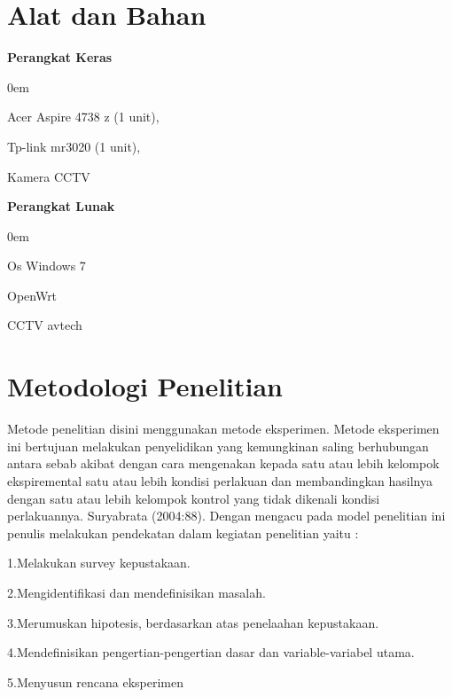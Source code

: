 \documentclass{jtetiproposalskripsi}
\begin{document}
\section{Alat dan Bahan}
\textbf{Perangkat Keras}
\vspace{-0.5cm}
\begin{enumerate}[a.]
\begin{singlespace}
\itemsep0em
\item Acer Aspire 4738 z (1 unit),
\item Tp-link mr3020 (1 unit),
\item Kamera CCTV 
\end{singlespace}
\end{enumerate}

\textbf{Perangkat Lunak}
\vspace{-0.5cm}
\begin{enumerate}[a.]
\begin{singlespace}
\itemsep0em
\item Os Windows 7
\item OpenWrt
\item CCTV avtech
\end{singlespace}
\end{enumerate}


\section{Metodologi Penelitian}
Metode penelitian disini menggunakan metode eksperimen. Metode eksperimen ini bertujuan melakukan penyelidikan yang kemungkinan saling berhubungan antara sebab akibat dengan cara mengenakan kepada satu atau lebih kelompok ekspiremental satu atau lebih kondisi perlakuan dan membandingkan hasilnya dengan satu atau lebih kelompok kontrol yang tidak dikenali kondisi perlakuannya. Suryabrata (2004:88). Dengan mengacu pada model penelitian ini penulis melakukan pendekatan dalam kegiatan penelitian yaitu :

1.Melakukan survey kepustakaan.

2.Mengidentifikasi dan mendefinisikan masalah.

3.Merumuskan hipotesis, berdasarkan atas penelaahan kepustakaan.

4.Mendefinisikan pengertian-pengertian dasar dan variable-variabel utama.

5.Menyusun rencana eksperimen

\end{document}
